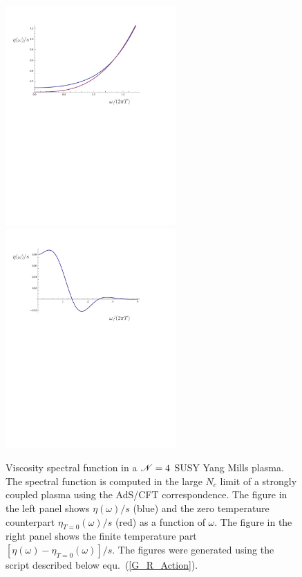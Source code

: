 \begin{figure}[t!]
\begin{center}
\includegraphics*[width=6.5cm]{Chapter2-figures/AdS5_Schwarz_eta_w_txt.pdf}
\includegraphics*[width=6.5cm]{Chapter2-figures/AdS5_Schwarz_eta_w_subtr_txt.pdf}
\end{center}
\caption{\label{fig_ads_spec_fct}
Viscosity spectral function in a ${\cal N}=4$ SUSY Yang Mills plasma. 
The spectral function is computed in the large $N_c$ limit of a strongly 
coupled plasma using the AdS/CFT correspondence. The figure in the left 
panel shows $\eta(\omega)/s$ (blue) and the zero temperature counterpart 
$\eta_{T=0}(\omega)/s$ (red) as a function of $\omega$. The figure in the 
right panel shows the finite temperature part $[\eta(\omega)-\eta_{T=0}
(\omega)]/s$. The figures were generated using the script described 
below equ.~(\ref{G_R_Action}).}
\end{figure}

